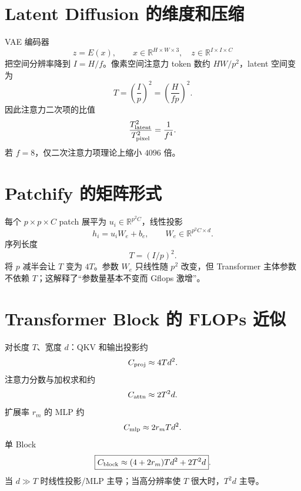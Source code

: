 \documentclass[UTF8,12pt,a4paper,fontset=none]{ctexart}
\numberwithin{equation}{section}
\newcommand{\R}{\mathbb{R}}
\begin{document}
\section{Latent Diffusion 的维度和压缩}
VAE 编码器
\begin{equation}
 z=E(x),\qquad x\in\R^{H\times W\times3},\quad z\in\R^{I\times I\times C}
\end{equation}
把空间分辨率降到 $I=H/f$。像素空间注意力 token 数约 $HW/p^2$，latent 空间变为
\begin{equation}
 T=\left(\frac{I}{p}\right)^2=\left(\frac{H}{fp}\right)^2.
\end{equation}
因此注意力二次项的比值
\begin{equation}
 \frac{T_{\rm latent}^2}{T_{\rm pixel}^2}=\frac1{f^4}.
\end{equation}
若 $f=8$，仅二次注意力项理论上缩小 $4096$ 倍。

\section{Patchify 的矩阵形式}
每个 $p\times p\times C$ patch 展平为 $u_i\in\R^{p^2C}$，线性投影
\begin{equation}
 h_i=u_iW_e+b_e,\qquad W_e\in\R^{p^2C\times d}.
\end{equation}
序列长度
\begin{equation}
 \boxed{T=(I/p)^2}.
\end{equation}
将 $p$ 减半会让 $T$ 变为 $4T$。参数 $W_e$ 只线性随 $p^2$ 改变，但 Transformer 主体参数不依赖 $T$；这解释了“参数量基本不变而 Gflops 激增”。

\section{Transformer Block 的 FLOPs 近似}
对长度 $T$、宽度 $d$：QKV 和输出投影约
\begin{equation}
 C_{\rm proj}\approx4Td^2.
\end{equation}
注意力分数与加权求和约
\begin{equation}
 C_{\rm attn}\approx2T^2d.
\end{equation}
扩展率 $r_m$ 的 MLP 约
\begin{equation}
 C_{\rm mlp}\approx2r_mTd^2.
\end{equation}
单 Block
\begin{equation}
 \boxed{C_{\rm block}\approx(4+2r_m)Td^2+2T^2d}.
\end{equation}
当 $d\gg T$ 时线性投影/MLP 主导；当高分辨率使 $T$ 很大时，$T^2d$ 主导。
\end{document}
